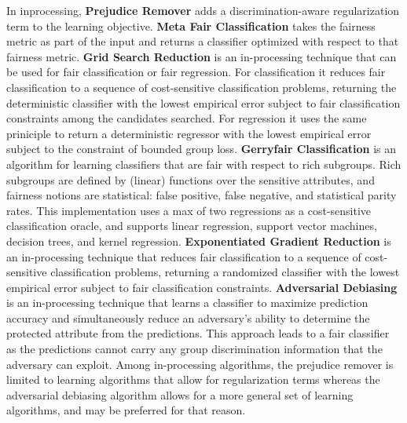 \documentclass[sigconf,review]{acmart}
\begin{document}
In inprocessing, \textbf{Prejudice Remover} \cite{kamishima2012prejudice} adds a discrimination-aware regularization term to the learning objective.
\textbf{Meta Fair Classification} takes the fairness metric as part of the input and returns a classifier optimized with respect to that fairness metric.
\textbf{Grid Search Reduction} is an in-processing technique that can be used for fair classification or fair regression. For classification it reduces fair classification to a sequence of cost-sensitive classification problems, returning the deterministic classifier with the lowest empirical error subject to fair classification constraints among the candidates searched. For regression it uses the same priniciple to return a deterministic regressor with the lowest empirical error subject to the constraint of bounded group loss.
\textbf{Gerryfair Classification} is an algorithm for learning classifiers that are fair with respect to rich subgroups. Rich subgroups are defined by (linear) functions over the sensitive attributes, and fairness notions are statistical: false positive, false negative, and statistical parity rates. This implementation uses a max of two regressions as a cost-sensitive classification oracle, and supports linear regression, support vector machines, decision trees, and kernel regression. 
\textbf{Exponentiated Gradient Reduction} is an in-processing technique that reduces fair classification to a sequence of cost-sensitive classification problems, returning a randomized classifier with the lowest empirical error subject to fair classification constraints.
\textbf{Adversarial Debiasing} is an in-processing technique that learns a classifier to maximize prediction accuracy and simultaneously reduce an adversary's ability to determine the protected attribute from the predictions. This approach leads to a fair classifier as the predictions cannot carry any group discrimination information that the adversary can exploit.
Among in-processing algorithms, the prejudice remover is limited to learning algorithms that allow for regularization terms whereas the adversarial debiasing algorithm allows for a more general set of learning algorithms, and may be preferred for that reason.



%
\end{document}
